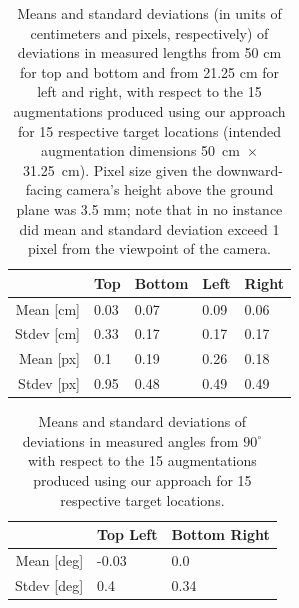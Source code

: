 \documentclass[review]{elsarticle}
\begin{document}
\begin{table}[ht]
\caption{Means and standard deviations (in units of centimeters and pixels, respectively) of deviations in measured lengths from 50 cm for top and bottom and from 21.25 cm for left and right, with respect to the 15 augmentations produced using our approach  for 15 respective target locations (intended augmentation dimensions 50~cm~$\times$~31.25~cm). Pixel size given the downward-facing camera's height above the ground plane was 3.5 mm; note that in no instance did mean and standard deviation exceed 1 pixel from the viewpoint of the camera.}
\label{table:length}
\centering
{\small
\begin{tabularx}{7.4cm}{r p{1cm} p{1cm} p{1cm} p{1cm}}
\toprule
  & Top & Bottom & Left & Right \\
\midrule
Mean {\tiny[cm]} & 0.03 & 0.07 & 0.09 & 0.06 \\
Stdev {\tiny[cm]} & 0.33 & 0.17 & 0.17 & 0.17 \\
\midrule
Mean {\tiny[px]} & 0.1 & 0.19 & 0.26 & 0.18 \\
Stdev {\tiny[px]} & 0.95 & 0.48 & 0.49 & 0.49 \\
\bottomrule
\end{tabularx}}
\end{table}

\begin{table}[ht]
\caption{Means and standard deviations of deviations in measured angles from $90^\circ{}$ with respect to the 15 augmentations produced using our approach for 15 respective target locations.}
\label{table:angle}
\centering
{\small
\begin{tabularx}{6.75cm}{r p{1.95cm} p{1.95cm}}
\toprule
  & Top Left & Bottom Right \\
\midrule
Mean {\tiny[deg]} & -0.03 & 0.0 \\
Stdev {\tiny[deg]} & 0.4 & 0.34 \\
\bottomrule
\end{tabularx}}
\end{table}
\end{document}
